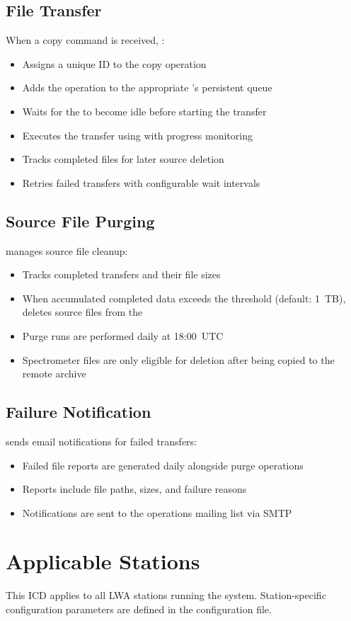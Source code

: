 \subsection{File Transfer}

When a copy command is received, \SC{}:
\begin{itemize}
    \item Assigns a unique ID to the copy operation
    \item Adds the operation to the appropriate \DR{}'s persistent queue
    \item Waits for the \DR{} to become idle before starting the transfer
    \item Executes the transfer using  with progress monitoring
    \item Tracks completed files for later source deletion
    \item Retries failed transfers with configurable wait intervals
\end{itemize}

\subsection{Source File Purging}

\SC{} manages source file cleanup:
\begin{itemize}
    \item Tracks completed transfers and their file sizes
    \item When accumulated completed data exceeds the  threshold (default: 1~TB), deletes source files from the \DR{}
    \item Purge runs are performed daily at 18:00~UTC
    \item Spectrometer files are only eligible for deletion after being copied to the remote archive
\end{itemize}

\subsection{Failure Notification}

\SC{} sends email notifications for failed transfers:
\begin{itemize}
    \item Failed file reports are generated daily alongside purge operations
    \item Reports include file paths, sizes, and failure reasons
    \item Notifications are sent to the operations mailing list via SMTP
\end{itemize}

\section{Applicable Stations}

This ICD applies to all LWA stations running the \SC{} system. Station-specific configuration parameters are defined in the  configuration file.

